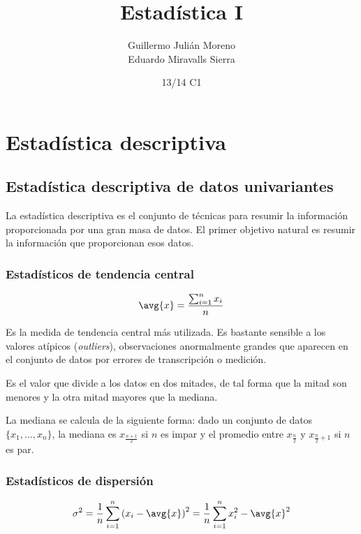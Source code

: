\documentclass{apuntes}
\author{Guillermo Julián Moreno \\ Eduardo Miravalls Sierra}
\date{13/14 C1}
\title{Estad\'{i}stica I}
\begin{document}
\pagestyle{plain}
\maketitle

\tableofcontents
\newpage
\chapter{Estadística descriptiva}
\section{Estadística descriptiva de datos univariantes}

La estadística descriptiva es el conjunto de técnicas para resumir la información proporcionada por una gran masa de datos. El primer objetivo natural es resumir la información que proporcionan esos datos.

\subsection{Estadísticos de tendencia central}

\begin{defn}[Media]

\[ \avg{x} = \frac{\sum_{i=1}^n x_i}{n} \]

Es la medida de tendencia central más utilizada. Es bastante sensible a los valores atípicos (\textit{outliers}), observaciones anormalmente grandes que aparecen en el conjunto de datos por errores de transcripción o medición.
\end{defn}

\begin{defn}[Mediana]
Es el valor que divide a los datos en dos mitades, de tal forma que la mitad son menores y la otra mitad mayores que la mediana.

La mediana se calcula de la siguiente forma: dado un conjunto de datos $\{x_1,\dotsc, x_n\}$, la mediana es $x_{\frac{n+1}{2}}$ si $n$ es impar y el promedio entre $x_{\frac{n}{2}}$ y $x_{\frac{n}{2} + 1}$ si $n$ es par.
\end{defn}

\subsection{Estadísticos de dispersión}

\begin{defn}[Varianza]
\[ \sigma^2 = \frac{1}{n} \sum_{i=1}^n \left(x_i - \avg{x}\right)^2 = \frac{1}{n} \sum_{i=1}^n x_i^2 - \avg{x}^2 \]
\end{defn}
\end{document}
